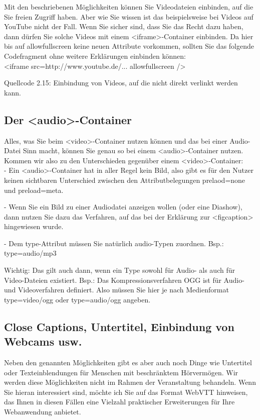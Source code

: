 Mit den beschriebenen Möglichkeiten können Sie Videodateien einbinden, auf die Sie freien Zugriff haben. Aber wie Sie wissen ist das beispielsweise bei Videos auf YouTube nicht der Fall. Wenn Sie sicher sind, dass Sie das Recht dazu haben, dann dürfen Sie solche Videos mit einem <iframe>-Container einbinden. Da hier bis auf allowfullscreen keine neuen Attribute vorkommen, sollten Sie das folgende Codefragment ohne weitere Erklärungen einbinden können:\\

<iframe src=http://www.youtube.de/...     allowfullscreen />

Quellcode 2.15: Einbindung von Videos, auf die nicht direkt verlinkt werden kann.

\subsection{Der <audio>-Container}

Alles, was Sie beim <video>-Container nutzen können und das bei einer Audio-Datei Sinn macht, können Sie genau so bei einem <audio>-Container nutzen. Kommen wir also zu den Unterschieden gegenüber einem <video>-Container:\\

-	Ein <audio>-Container hat in aller Regel kein Bild, also gibt es für den Nutzer keinen sichtbaren Unterschied zwischen den Attributbelegungen prelaod=none und preload=meta.

-	Wenn Sie ein Bild zu einer Audiodatei anzeigen wollen (oder eine Diashow), dann nutzen Sie dazu das Verfahren, auf das bei der Erklärung zur <figcaption> hingewiesen wurde.

-	Dem type-Attribut müssen Sie natürlich audio-Typen zuordnen.
Bsp.: type=audio/mp3

Wichtig: Das gilt auch dann, wenn ein Type sowohl für Audio- als auch für Video-Dateien existiert. Bsp.: Das Kompressionsverfahren OGG ist für Audio- und Videoverfahren definiert. Also müssen Sie hier je nach Medienformat type=video/ogg oder type=audio/ogg angeben.

\subsection{Close Captions, Untertitel, Einbindung von Webcams usw.}

Neben den genannten Möglichkeiten gibt es aber auch noch Dinge wie Untertitel oder Texteinblendungen für Menschen mit beschränktem Hörvermögen. Wir werden diese Möglichkeiten nicht im Rahmen der Veranstaltung behandeln. Wenn Sie hieran interessiert sind, möchte ich Sie auf das Format WebVTT hinweisen, das Ihnen in diesen Fällen eine Vielzahl praktischer Erweiterungen für Ihre Webanwendung anbietet.\\


